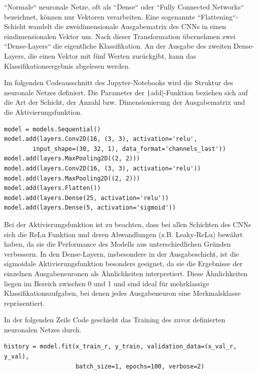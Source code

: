 ``Normale`` neuronale Netze, oft als ``Dense`` oder ``Fully Connected Networks`` bezeichnet, können nur Vektoren verarbeiten. Eine sogenannte ``Flattening``-Schicht wandelt die zweidimensionale Ausgabematrix des CNNs in einen eindimensionalen Vektor um. Nach dieser Transformation übernehmen zwei ``Dense-Layers`` die eigentliche Klassifikation. An der Ausgabe des zweiten Dense-Layers, die einen Vektor mit fünf Werten zurückgibt, kann das Klassifikationsergebnis abgelesen werden. \cite{how-cnn-work}

Im folgenden Codeausschnitt des Jupyter-Notebooks wird die Struktur des neuronale Netzes definiert. Die Parameter der \texttt|add|-Funktion beziehen sich auf die Art der Schicht, der Anzahl bzw. Dimensionierung der Ausgabematrix und die Aktivierungsfunktion.

\begin{verbatim}
model = models.Sequential()
model.add(layers.Conv2D(16, (3, 3), activation='relu', 
		input_shape=(30, 32, 1), data_format='channels_last'))
model.add(layers.MaxPooling2D((2, 2)))
model.add(layers.Conv2D(16, (3, 3), activation='relu'))
model.add(layers.MaxPooling2D((2, 2)))
model.add(layers.Flatten())
model.add(layers.Dense(25, activation='relu'))
model.add(layers.Dense(5, activation='sigmoid'))	
\end{verbatim}

Bei der Aktivierungsfunktion ist zu beachten, dass bei allen Schichten des CNNs sich die ReLu Funktion und deren Abwandlungen (z.B. Leaky-ReLu) bewährt haben, da sie die Performance des Modells aus unterschiedlichen Gründen verbessern. In den Dense-Layern, insbesondere in der Ausgabeschicht, ist die sigmoidale Aktivierungsfunktion besonders geeignet, da sie die Ergebnisse der einzelnen Ausgabeneuronen als Ähnlichkeiten interpretiert. Diese Ähnlichkeiten liegen im Bereich zwischen 0 und 1 und sind ideal für mehrklassige Klassifikationsaufgaben, bei denen jedes Ausgabeneuron eine Merkmalsklasse repräsentiert. \cite{cnn-relu-sigmoid}

In der folgenden Zeile Code geschieht das Training des zuvor definierten neuronalen Netzes durch.

\begin{verbatim}
history = model.fit(x_train_r, y_train, validation_data=(x_val_r, y_val),
                    batch_size=1, epochs=100, verbose=2)
\end{verbatim}

